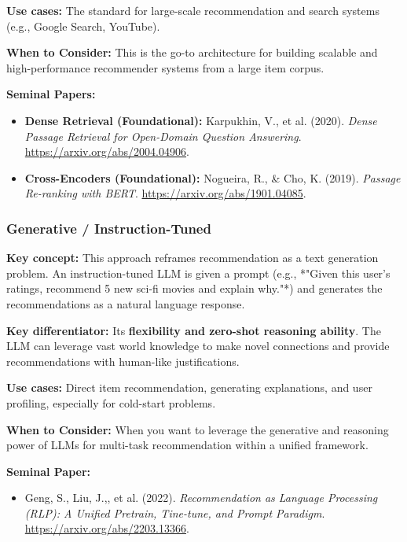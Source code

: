 \documentclass{article}
\begin{document}
\noindent\textbf{Use cases:} The standard for large-scale recommendation and search systems (e.g., Google Search, YouTube).

\noindent\textbf{When to Consider:} This is the go-to architecture for building scalable and high-performance recommender systems from a large item corpus.

\noindent\textbf{Seminal Papers:}
    \begin{itemize}
        \item \textbf{Dense Retrieval (Foundational):} Karpukhin, V., et al. (2020). \textit{Dense Passage Retrieval for Open-Domain Question Answering}. \url{https://arxiv.org/abs/2004.04906}.
        \item \textbf{Cross-Encoders (Foundational):} Nogueira, R., \& Cho, K. (2019). \textit{Passage Re-ranking with BERT}. \url{https://arxiv.org/abs/1901.04085}.
    \end{itemize}

    \subsubsection{Generative / Instruction-Tuned}
\noindent\textbf{Key concept:} This approach reframes recommendation as a text generation problem. An instruction-tuned LLM is given a prompt (e.g., *"Given this user's ratings, recommend 5 new sci-fi movies and explain why."*) and generates the recommendations as a natural language response.

\noindent\textbf{Key differentiator:} Its \textbf{flexibility and zero-shot reasoning ability}. The LLM can leverage vast world knowledge to make novel connections and provide recommendations with human-like justifications.

\noindent\textbf{Use cases:} Direct item recommendation, generating explanations, and user profiling, especially for cold-start problems.

\noindent\textbf{When to Consider:} When you want to leverage the generative and reasoning power of LLMs for multi-task recommendation within a unified framework.

\noindent\textbf{Seminal Paper:}
    \begin{itemize}
        \item Geng, S., Liu, J.,, et al. (2022). \textit{Recommendation as Language Processing (RLP): A Unified Pretrain, Tine-tune, and Prompt Paradigm}. \url{https://arxiv.org/abs/2203.13366}.
    \end{itemize}
\end{document}
